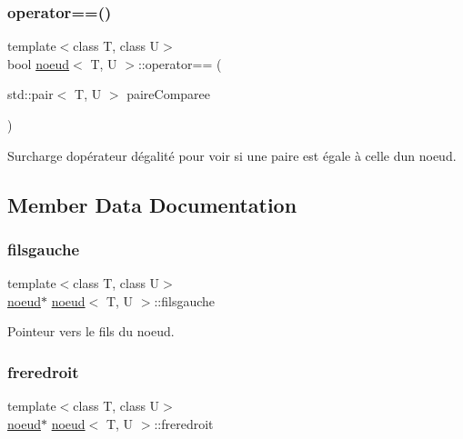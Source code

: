 \subsubsection{\texorpdfstring{operator==()}{operator==()}}
{\footnotesize\ttfamily template$<$class T, class U$>$ \\
bool \hyperlink{classnoeud}{noeud}$<$ T, U $>$\+::operator== (\begin{DoxyParamCaption}\item[{std\+::pair$<$ T, U $>$}]{paire\+Comparee }\end{DoxyParamCaption})\hspace{0.3cm}{\ttfamily [inline]}}



Surcharge d\textquotesingle{}opérateur d\textquotesingle{}égalité pour voir si une paire est égale à celle d\textquotesingle{}un noeud. 



\subsection{Member Data Documentation}
\mbox{\label{classnoeud_ae467dc4fa40f58924f45ac7ca634cd03}} 
\subsubsection{\texorpdfstring{filsgauche}{filsgauche}}
{\footnotesize\ttfamily template$<$class T, class U$>$ \\
\hyperlink{classnoeud}{noeud}$\ast$ \hyperlink{classnoeud}{noeud}$<$ T, U $>$\+::filsgauche}



Pointeur vers le fils du noeud. 

\mbox{\label{classnoeud_aaeab078493a53d62f1ae0a99e53a9308}} 
\subsubsection{\texorpdfstring{freredroit}{freredroit}}
{\footnotesize\ttfamily template$<$class T, class U$>$ \\
\hyperlink{classnoeud}{noeud}$\ast$ \hyperlink{classnoeud}{noeud}$<$ T, U $>$\+::freredroit}




